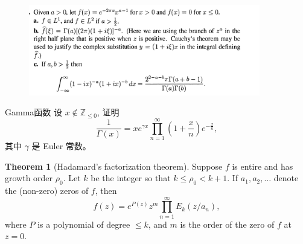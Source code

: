 \documentclass{beamer}
\theoremstyle{definition}
\newtheorem{theo}[defn]{Theorem}
\begin{document}
\begin{frame}
    \begin{figure}
        \centering
        \includegraphics[width=0.9\textwidth]{ftran-expfunction.png}
    \end{figure}
\end{frame}
\begin{frame}{Gamma函数}
设 $x \notin \mathbb{Z}_{\leqslant 0}$, 证明
$$
\frac{1}{\Gamma(x)}=x e^{\gamma x} \prod_{n=1}^{\infty}\left(1+\frac{x}{n}\right) e^{-\frac{x}{n}},
$$
其中 $\gamma$ 是 Euler 常数。
\end{frame}
\begin{frame}
    \begin{theo}[Hadamard’s factorization theorem]
    Suppose $f$ is entire and has growth order $\rho_0$. Let $k$ be the integer so that $k \leq \rho_0<k+1$. If $a_1, a_2, \ldots$ denote the (non-zero) zeros of $f$, then
$$
f(z)=e^{P(z)} z^m \prod_{n=1}^{\infty} E_k\left(z / a_n\right),
$$
where $P$ is a polynomial of degree $\leq k$, and $m$ is the order of the zero of $f$ at $z=0$.
    \end{theo}
\end{frame}
\end{document}
